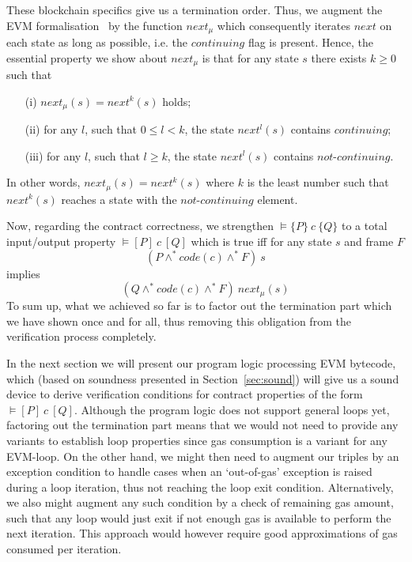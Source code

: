 \documentclass[sigplan,10pt]{acmart}\settopmatter{printfolios=true,printccs=false,printacmref=false}
\newcommand{\sconj}{\wedge^*}
\newcommand{\pvalid}[3]{\models\{#1\}\:#2\:\{#3\}}
\newcommand{\tvalid}[3]{\models[#1]\:#2\:[#3]}
\newcommand{\xnext}{\mathit{next}}
\newcommand{\code}[1]{\mathit{code}(#1)}
\newcommand{\cont}{\mathit{continuing}}
\newcommand{\ncont}{\mathit{not\mbox{-}continuing}}
\begin{document}
These blockchain specifics give us a termination order. Thus, we 
augment the EVM formalisation~\cite{Yoichi} by the function $\xnext_\mu$ which 
consequently iterates $\xnext$ on each state as long as possible, i.e. the $\cont$ flag
is present.
Hence, the essential property we show about $\xnext_\mu$ is that for any state $s$ there exists $k \geq 0$ such that
\begin{itemize}
\item[(i)] $\xnext_\mu(s) = \xnext^k(s)$ holds;
\item[(ii)] for any $l$, such that $0 \le l < k$, the state $\xnext^l(s)$ contains $\cont$;
%
\item[(iii)] for any $l$, such that $l \ge k$, the state $\xnext^l(s)$ contains $\ncont$.
\end{itemize}
In other words, $\xnext_\mu(s) = \xnext^k(s)$ where $k$ is the least number such that
$\xnext^k(s)$ reaches a state with the $\ncont$ element. 

Now, regarding the contract correctness, we strengthen $\pvalid{P}{c}{Q}$ to 
a total input/output property $\tvalid{P}{c}{Q}$ which is true iff
for any state $s$ and frame $F$ 
\[
(P \sconj \code{c} \sconj F)\: s
\] 
implies 
\[
(Q \sconj \code{c} \sconj F)\: \xnext_\mu(s)
\] 
To sum up, what we achieved so far is to factor out the termination part which we have 
shown once and for all, thus removing this obligation from the verification
process completely. 

In the next section we will present our program logic processing EVM bytecode, 
which (based on soundness presented in Section~\ref{sec:sound}) will give us 
a sound device to derive verification conditions for contract properties of the form $\tvalid{P}{c}{Q}$.   
%
Although the program logic does not support general loops yet, factoring out the termination part
means that we would not need to provide any variants to establish loop properties since
gas consumption is a variant for any EVM-loop. On the other hand, we might then need to augment our triples
by an exception condition to handle cases when an `out-of-gas' exception is raised during
a loop iteration, thus not reaching the loop exit condition. Alternatively, we also might augment
any such condition by a check of remaining gas amount, such that any loop would just exit if not enough gas
is available to perform the next iteration. This approach would however require good approximations
of gas consumed per iteration.   
%
%       
\end{document}

